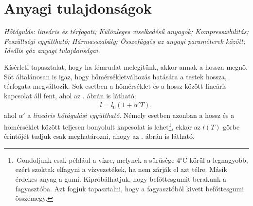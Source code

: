 \section{Anyagi tulajdonságok}

\emph{Hőtágulás: lineáris és térfogati; Különleges viselkedésű anyagok; Kompresszibilitás; Feszültségi együttható; Hármasszabály; Összefüggés az anyagi paraméterek között; Ideális gáz anyagi tulajdonságai.}

Kísérleti tapasztalat, hogy ha fémrudat melegítünk, akkor annak a hossza megnő. Sőt általánosan is igaz, hogy hőmérsékletváltozás hatására a testek hossza, térfogata megváltozik. Sok esetben a hőmérséklet és a hossz között lineáris kapcsolat áll fent, ahol az . ábrán is látható:
\begin{align}
    l = l_0(1+\alpha' T),
\end{align}
ahol $\alpha'$ a \emph{lineáris hőtágulási együttható}. Némely esetben azonban a hossz és  a hőmérséklet között teljesen bonyolult kapcsolat is lehet\footnote{\,Gondoljunk csak például a vízre, melynek a sűrűsége 4$^\circ$C körül a legnagyobb, ezért szoktak elfagyni a vízvezetékek, ha nem zárják el azt télre. Másik érdekes anyag a gumi. Kipróbálhatjuk, hogy befőttesgumit berakunk a fagyasztóba. Azt fogjuk tapasztalni, hogy a fagyasztóból kivett befőttesgumi összemegy.}, ekkor az $l(T)$ görbe érintőjét tudjuk csak meghatározni, ahogy az . ábrán is látható.
